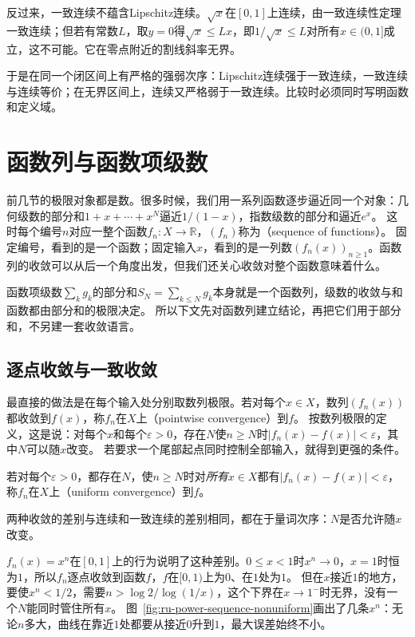 反过来，一致连续不蕴含Lipschitz连续。$\sqrt x$在$[0,1]$上连续，由一致连续性定理一致连续；但若有常数$L$，取$y=0$得$\sqrt x\leq Lx$，即$1/\sqrt x\leq L$对所有$x\in(0,1]$成立，这不可能。它在零点附近的割线斜率无界。

于是在同一个闭区间上有严格的强弱次序：Lipschitz连续强于一致连续，一致连续与连续等价；在无界区间上，连续又严格弱于一致连续。比较时必须同时写明函数和定义域。
\section{函数列与函数项级数}
\label{sec:ru-function-sequences}

前几节的极限对象都是数。很多时候，我们用一系列函数逐步逼近同一个对象：几何级数的部分和$1+x+\cdots+x^N$逼近$1/(1-x)$，指数级数的部分和逼近$e^x$。
这时每个编号$n$对应一整个函数$f_n:X\to\mathbb R$，$(f_n)$称为（sequence of functions）。
固定编号，看到的是一个函数；固定输入$x$，看到的是一列数$(f_n(x))_{n\geq1}$。函数列的收敛可以从后一个角度出发，但我们还关心收敛对整个函数意味着什么。

函数项级数$\sum_kg_k$的部分和$S_N=\sum_{k\leq N}g_k$本身就是一个函数列，级数的收敛与和函数都由部分和的极限决定。
所以下文先对函数列建立结论，再把它们用于部分和，不另建一套收敛语言。

\subsection{逐点收敛与一致收敛}
\label{sec:ru-pointwise-uniform}

最直接的做法是在每个输入处分别取数列极限。若对每个$x\in X$，数列$(f_n(x))$都收敛到$f(x)$，称$f_n$在$X$上（pointwise convergence）到$f$。
按数列极限的定义，这是说：对每个$x$和每个$\varepsilon>0$，存在$N$使$n\geq N$时$|f_n(x)-f(x)|<\varepsilon$，其中$N$可以随$x$改变。
若要求一个尾部起点同时控制全部输入，就得到更强的条件。
\begin{definition}[一致收敛]
\label{def:ru-uniform-convergence}
若对每个$\varepsilon>0$，都存在$N$，使$n\geq N$时对\emph{所有}$x\in X$都有$|f_n(x)-f(x)|<\varepsilon$，称$f_n$在$X$上（uniform convergence）到$f$。
\end{definition}
两种收敛的差别与连续和一致连续的差别相同，都在于量词次序：$N$是否允许随$x$改变。

$f_n(x)=x^n$在$[0,1]$上的行为说明了这种差别。$0\leq x<1$时$x^n\to0$，$x=1$时恒为$1$，所以$f_n$逐点收敛到函数$f$，$f$在$[0,1)$上为$0$、在$1$处为$1$。
但在$x$接近$1$的地方，要使$x^n<1/2$，需要$n>\log2/\log(1/x)$，这个下界在$x\to1^-$时无界，没有一个$N$能同时管住所有$x$。
图~\ref{fig:ru-power-sequence-nonuniform}画出了几条$x^n$：无论$n$多大，曲线在靠近$1$处都要从接近$0$升到$1$，最大误差始终不小。


